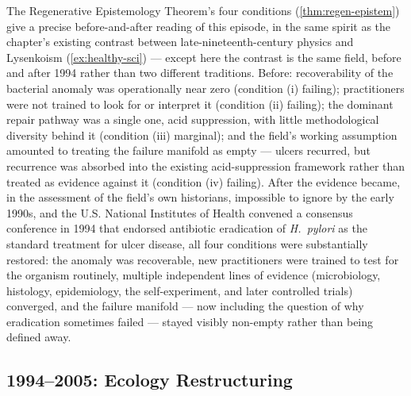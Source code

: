 \documentclass[12pt,twoside,openright]{book}
\begin{document}
The Regenerative Epistemology Theorem's four conditions
(\cref{thm:regen-epistem}) give a precise before-and-after reading
of this episode, in the same spirit as the chapter's existing
contrast between late-nineteenth-century physics and Lysenkoism
(\cref{ex:healthy-sci}) --- except here the contrast is the same
field, before and after 1994 rather than two different
traditions. Before: recoverability of the bacterial anomaly was
operationally near zero (condition (i) failing); practitioners
were not trained to look for or interpret it (condition (ii)
failing); the dominant repair pathway was a single one, acid
suppression, with little methodological diversity behind it
(condition (iii) marginal); and the field's working assumption
amounted to treating the failure manifold as empty --- ulcers
recurred, but recurrence was absorbed into the existing
acid-suppression framework rather than treated as evidence
against it (condition (iv) failing). After the evidence became,
in the assessment of the field's own historians, impossible to
ignore by the early 1990s, and the U.S. National Institutes of
Health convened a consensus conference in 1994 that endorsed
antibiotic eradication of \emph{H.\ pylori} as the standard
treatment for ulcer disease, all four conditions were
substantially restored: the anomaly was recoverable, new
practitioners were trained to test for the organism routinely,
multiple independent lines of evidence (microbiology, histology,
epidemiology, the self-experiment, and later controlled trials)
converged, and the failure manifold --- now including the
question of why eradication sometimes failed --- stayed visibly
non-empty rather than being defined away.

\subsection{1994--2005: Ecology Restructuring}
\end{document}
